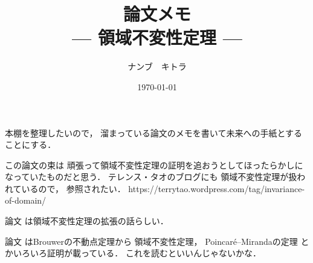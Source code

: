 \documentclass[leqno, a4paper, 12pt]{jsarticle}
\title{論文メモ
\large{\\--- 領域不変性定理 ---}
}
\author{ナンブ　キトラ}
\date{\today}
\begin{document}
\maketitle

本棚を整理したいので，
溜まっている論文のメモを書いて未来への手紙とすることにする．

この論文の束は
頑張って領域不変性定理の証明を追おうとしてほったらかしになっていたものだと思う．
テレンス・タオのブログにも
領域不変性定理が扱われているので，
参照されたい．
https://terrytao.wordpress.com/tag/invariance-of-domain/


論文
\cite{MR1978889}
は領域不変性定理の拡張の話らしい．

論文
\cite{MR1696596}
はBrouwerの不動点定理から
領域不変性定理，
Poincar\'{e}--Mirandaの定理
とかいろいろ証明が載っている．
これを読むといいんじゃないかな．


\nocite{*}


\end{document}
